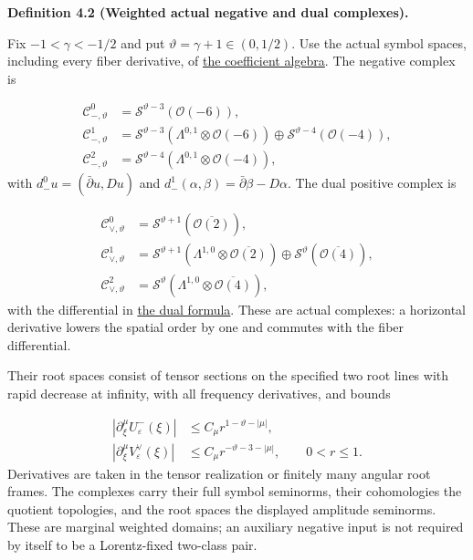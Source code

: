 \documentclass[
  english,
  11pt,
  reqno]{amsart}
\makeatletter
\newcommand{\pandocstatementheading}[1]{%
  \par\addpenalty{\@beginparpenalty}%
  \addvspace{.5\baselineskip plus .2\baselineskip minus .2\baselineskip}%
  {\normalfont\bfseries #1\par}%
  \nobreak\@afterindenttrue\@afterheading
}
\makeatother
\begin{document}
\pandocstatementheading{\leavevmode{}\label{def:online-negative-dual-weighted-complexes}Definition 4.2 (Weighted actual negative and dual complexes).}

Fix \(-1<\gamma<-1/2\) and put \(\vartheta=\gamma+1\in(0,1/2)\). Use the
actual symbol spaces, including every fiber derivative, of
\hyperref[sec:online-actual-coefficient-complexes]{the coefficient
algebra}. The negative complex is

\label{eq:online-negative-actual-weighted-complex} \[
\begin{aligned}
\mathscr C_{-,\vartheta}^{0}
&=\mathscr S^{\vartheta-3}(\mathcal O(-6)),\\
\mathscr C_{-,\vartheta}^{1}
&=\mathscr S^{\vartheta-3}
  (\Lambda^{0,1}\otimes\mathcal O(-6))
\oplus\mathscr S^{\vartheta-4}(\mathcal O(-4)),\\
\mathscr C_{-,\vartheta}^{2}
&=\mathscr S^{\vartheta-4}
  (\Lambda^{0,1}\otimes\mathcal O(-4)),
\end{aligned}
\] with \(d_-^0u=(\bar\partial u,Du)\) and
\(d_-^1(\alpha,\beta)=\bar\partial\beta-D\alpha\). The dual positive
complex is

\label{eq:online-dual-positive-actual-weighted-complex}
\[
\begin{aligned}
\mathscr C_{\vee,\vartheta}^{0}
&=\mathscr S^{\vartheta+1}(\overline{\mathcal O(2)}),\\
\mathscr C_{\vee,\vartheta}^{1}
&=\mathscr S^{\vartheta+1}
  (\Lambda^{1,0}\otimes\overline{\mathcal O(2)})
\oplus\mathscr S^{\vartheta}(\overline{\mathcal O(4)}),\\
\mathscr C_{\vee,\vartheta}^{2}
&=\mathscr S^{\vartheta}
  (\Lambda^{1,0}\otimes\overline{\mathcal O(4)}),
\end{aligned}
\] with the differential in
\hyperref[eq:online-dual-positive-differential]{the dual formula}. These
are actual complexes: a horizontal derivative lowers the spatial order
by one and commutes with the fiber differential.

Their root spaces consist of tensor sections on the specified two root
lines with rapid decrease at infinity, with all frequency derivatives,
and bounds

\label{eq:online-negative-dual-weighted-root-bounds} \[
\begin{aligned}
|\partial_\xi^\mu U^-_\varepsilon(\xi)|
&\le C_\mu r^{1-\vartheta-|\mu|},\\
|\partial_\xi^\mu V^\vee_\varepsilon(\xi)|
&\le C_\mu r^{-\vartheta-3-|\mu|},
\qquad 0<r\le1.
\end{aligned}
\] Derivatives are taken in the tensor realization or finitely many
angular root frames. The complexes carry their full symbol seminorms,
their cohomologies the quotient topologies, and the root spaces the
displayed amplitude seminorms. These are marginal weighted domains; an
auxiliary negative input is not required by itself to be a Lorentz-fixed
two-class pair.
\end{document}
